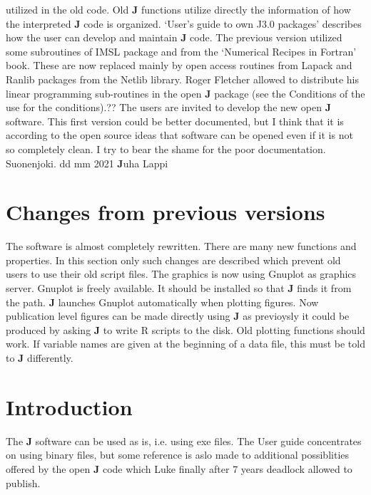 utilized in the old code. Old \textbf{J} functions utilize directly the
information of how the interpreted \textbf{J} code is organized. ‘User’s
guide to own J3.0 packages’ describes how the user can develop
and maintain \textbf{J} code.
The previous version utilized some subroutines of IMSL package and
from the ‘Numerical Recipes in Fortran’ book.  These are now replaced
mainly by open access routines from Lapack and Ranlib packages from
the Netlib library. Roger Fletcher allowed to distribute his linear
programming sub-routines in the open \textbf{J} package (see the Conditions
of the use for the conditions).??
The users are invited to develop the new open \textbf{J} software. This first
version could be better documented, but I think that it is according
to the open source ideas that software can be opened even if it is
not so completely clean. I try to bear the shame for the poor
documentation.
Suonenjoki. dd mm 2021
\textbf{J}uha Lappi
\section*{Changes from previous versions}  %
\label{changes}
The software is almost  completely rewritten. There are many new functions and properties. In
this section only such changes are described which prevent old users to use their old script files.
The graphics is now using Gnuplot as graphics server. Gnuplot is freely available. It should be installed so
that \textbf{J} finds it from the path. \textbf{J} launches Gnuplot automatically when plotting figures. Now publication level
figures can be made directly using \textbf{J} as previoysly it could be produced by asking \textbf{J} to write R scripts
to the disk. Old plotting functions should work.
If variable names are given at the beginning  of a data file, this must be told to \textbf{J} differently.
\section{Introduction}
\label{intro}
The \textbf{J} software can be used as is, i.e. using exe files. The User guide concentrates
on using binary files, but some reference is aslo made to additional possiblities offered
by the open \textbf{J} code which Luke finally after 7 years deadlock allowed to publish.
